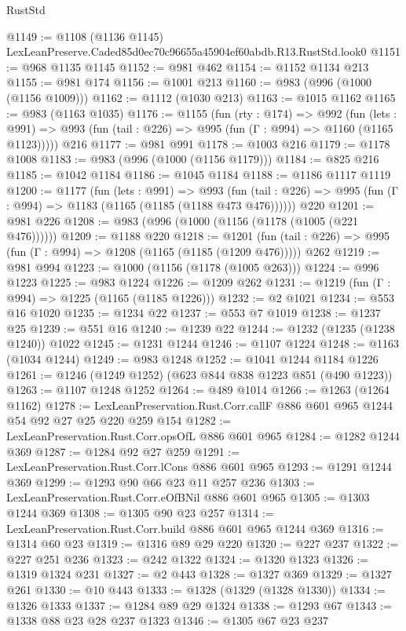 \begin{lexlean}{RustStd}
\begin{coremodule}
@1149 := @1108 (@1136 @1145) LexLeanPreserve.Caded85d0ec70c96655a45904ef60abdb.R13.RustStd.look0
@1151 := @968 @1135 @1145
@1152 := @981 @462
@1154 := @1152 @1134 @213
@1155 := @981 @174
@1156 := @1001 @213
@1160 := @983 (@996 (@1000 (@1156 @1009)))
@1162 := @1112 (@1030 @213)
@1163 := @1015 @1162
@1165 := @983 (@1163 @1035)
@1176 := @1155
    (fun (rty : @174) =>
    @992
      (fun (lets : @991) =>
      @993 (fun (tail : @226) => @995 (fun (Γ : @994) => @1160 (@1165 @1123)))))
    @216
@1177 := @981 @991
@1178 := @1003 @216
@1179 := @1178 @1008
@1183 := @983 (@996 (@1000 (@1156 @1179)))
@1184 := @825 @216
@1185 := @1042 @1184
@1186 := @1045 @1184
@1188 := @1186 @1117 @1119
@1200 := @1177
    (fun (lets : @991) =>
    @993 (fun (tail : @226) => @995 (fun (Γ : @994) => @1183 (@1165 (@1185 (@1188 @473 @476))))))
    @220
@1201 := @981 @226
@1208 := @983 (@996 (@1000 (@1156 (@1178 (@1005 (@221 @476))))))
@1209 := @1188 @220
@1218 := @1201
    (fun (tail : @226) => @995 (fun (Γ : @994) => @1208 (@1165 (@1185 (@1209 @476)))))
    @262
@1219 := @981 @994
@1223 := @1000 (@1156 (@1178 (@1005 @263)))
@1224 := @996 @1223
@1225 := @983 @1224
@1226 := @1209 @262
@1231 := @1219 (fun (Γ : @994) => @1225 (@1165 (@1185 @1226)))
@1232 := @2 @1021
@1234 := @553 @16 @1020
@1235 := @1234 @22
@1237 := @553 @7 @1019
@1238 := @1237 @25
@1239 := @551 @16
@1240 := @1239 @22
@1244 := @1232 (@1235 (@1238 @1240)) @1022
@1245 := @1231 @1244
@1246 := @1107 @1224
@1248 := @1163 (@1034 @1244)
@1249 := @983 @1248
@1252 := @1041 @1244 @1184 @1226
@1261 := @1246 (@1249 @1252) (@623 @844 @838 @1223 @851 (@490 @1223))
@1263 := @1107 @1248 @1252
@1264 := @489 @1014
@1266 := @1263 (@1264 @1162)
@1278 := LexLeanPreservation.Rust.Corr.callF @886 @601 @965 @1244 @54 @92 @27 @25 @220 @259 @154
@1282 := LexLeanPreservation.Rust.Corr.opsOfL @886 @601 @965
@1284 := @1282 @1244 @369
@1287 := @1284 @92 @27 @259
@1291 := LexLeanPreservation.Rust.Corr.lCons @886 @601 @965
@1293 := @1291 @1244 @369
@1299 := @1293 @90 @66 @23 @11 @257 @236
@1303 := LexLeanPreservation.Rust.Corr.eOfBNil @886 @601 @965
@1305 := @1303 @1244 @369
@1308 := @1305 @90 @23 @257
@1314 := LexLeanPreservation.Rust.Corr.build @886 @601 @965 @1244 @369
@1316 := @1314 @60 @23
@1319 := @1316 @89 @29 @220
@1320 := @227 @237
@1322 := @227 @251 @236
@1323 := @242 @1322
@1324 := @1320 @1323
@1326 := @1319 @1324 @231
@1327 := @2 @443
@1328 := @1327 @369
@1329 := @1327 @261
@1330 := @10 @443
@1333 := @1328 (@1329 (@1328 @1330))
@1334 := @1326 @1333
@1337 := @1284 @89 @29 @1324
@1338 := @1293 @67
@1343 := @1338 @88 @23 @28 @237 @1323
@1346 := @1305 @67 @23 @237

\end{coremodule}
\end{lexlean}
